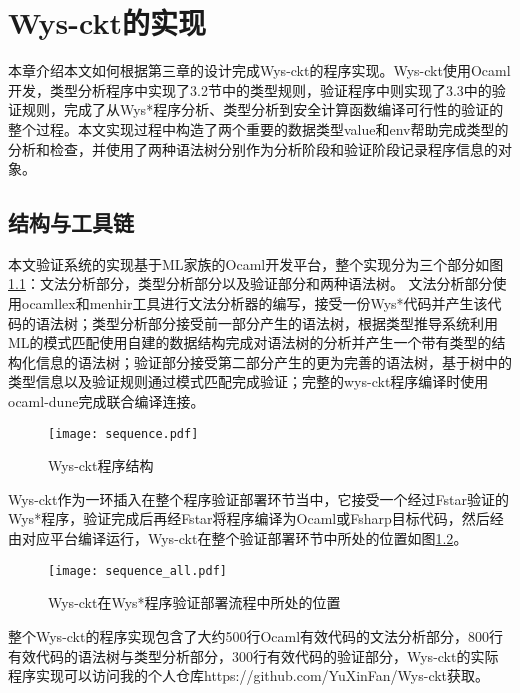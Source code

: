\chapter{Wys-ckt的实现}\label{impl}
本章介绍本文如何根据第三章的设计完成Wys-ckt的程序实现。Wys-ckt使用Ocaml开发，类型分析程序中实现了3.2节中的类型规则，验证程序中则实现了3.3中的验证规则，完成了从Wys*程序分析、类型分析到安全计算函数编译可行性的验证的整个过程。本文实现过程中构造了两个重要的数据类型value和env帮助完成类型的分析和检查，并使用了两种语法树分别作为分析阶段和验证阶段记录程序信息的对象。
\section{结构与工具链}
本文验证系统的实现基于ML家族的Ocaml开发平台，整个实现分为三个部分如图\ref{fig:sequence}：文法分析部分，类型分析部分以及验证部分和两种语法树。
文法分析部分使用ocamllex和menhir工具进行文法分析器的编写，接受一份Wys*代码并产生该代码的语法树；类型分析部分接受前一部分产生的语法树，根据类型推导系统利用ML的模式匹配使用自建的数据结构完成对语法树的分析并产生一个带有类型的结构化信息的语法树；验证部分接受第二部分产生的更为完善的语法树，基于树中的类型信息以及验证规则通过模式匹配完成验证；完整的wys-ckt程序编译时使用ocaml-dune完成联合编译连接。
\begin{figure}[!htbp]
    \centering
    \texttt{[image: sequence.pdf]}
    \caption{Wys-ckt程序结构}
    \label{fig:sequence}
\end{figure}

Wys-ckt作为一环插入在整个程序验证部署环节当中，它接受一个经过Fstar验证的Wys*程序，验证完成后再经Fstar将程序编译为Ocaml或Fsharp目标代码，然后经由对应平台编译运行，Wys-ckt在整个验证部署环节中所处的位置如图\ref{fig:position_sequence}。

\begin{figure}[!htbp]
    \centering
    \texttt{[image: sequence\_all.pdf]}
    \caption{Wys-ckt在Wys*程序验证部署流程中所处的位置}
    \label{fig:position_sequence}
\end{figure}

整个Wys-ckt的程序实现包含了大约500行Ocaml有效代码的文法分析部分，800行有效代码的语法树与类型分析部分，300行有效代码的验证部分，Wys-ckt的实际程序实现可以访问我的个人仓库https://github.com/YuXinFan/Wys-ckt获取。
